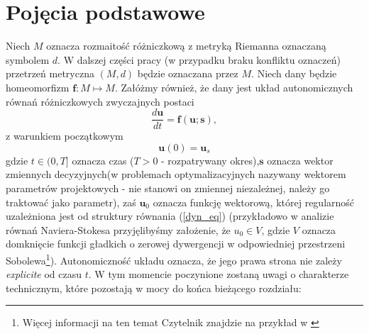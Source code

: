 \documentclass[12pt, twoside]{book}
\begin{document}
\section{Pojęcia podstawowe}
Niech $ M $ oznacza rozmaitość różniczkową z metryką Riemanna oznaczaną symbolem $ d $. W dalszej części pracy (w przypadku braku konfliktu oznaczeń) przetrzeń metryczna $ (M,d) $ będzie oznaczana przez $ M $. Niech dany będzie homeomorfizm $  \textbf{f}: M \mapsto M$.
Załóżmy również, że dany jest układ autonomicznych równań różniczkowych zwyczajnych postaci
\begin{equation}
\frac{d\textbf{u}}{dt} =  \textbf{f}(\textbf{u};\textbf{s}),
\label{dyn_eq}
\end{equation}
z warunkiem początkowym
\begin{equation}
\textbf{u}(0) = \textbf{u}_{s}
\label{U1}
\end{equation}
gdzie $t\in(0,T]$ oznacza czas ($ T>0 $ - rozpatrywany okres),$ \textbf{s} $ oznacza wektor zmiennych decyzyjnych(w problemach optymalizacyjnych nazywany wektorem parametrów projektowych  - nie stanowi on zmiennej niezależnej, należy go traktować jako parametr), zaś $ \textbf{u}_{0} $ oznacza funkcję wektorową, której regularność uzależniona jest od struktury równania (\ref{dyn_eq}) (przykładowo w analizie równań Naviera-Stokesa przyjęlibyśmy założenie, że $ u_{0}\in V $, gdzie $ V $ oznacza domknięcie funkcji gładkich o zerowej dywergencji w odpowiedniej przestrzeni Sobolewa\footnote{Więcej informacji na ten temat Czytelnik znajdzie na przykład w \cite{Teman}}). Autonomiczność układu oznacza, że jego prawa strona nie zależy \textit{explicite} od czasu $ t $.\newline
W tym momencie poczynione zostaną uwagi o charakterze technicznym, które pozostają w mocy do końca bieżącego rozdziału:
\end{document}
